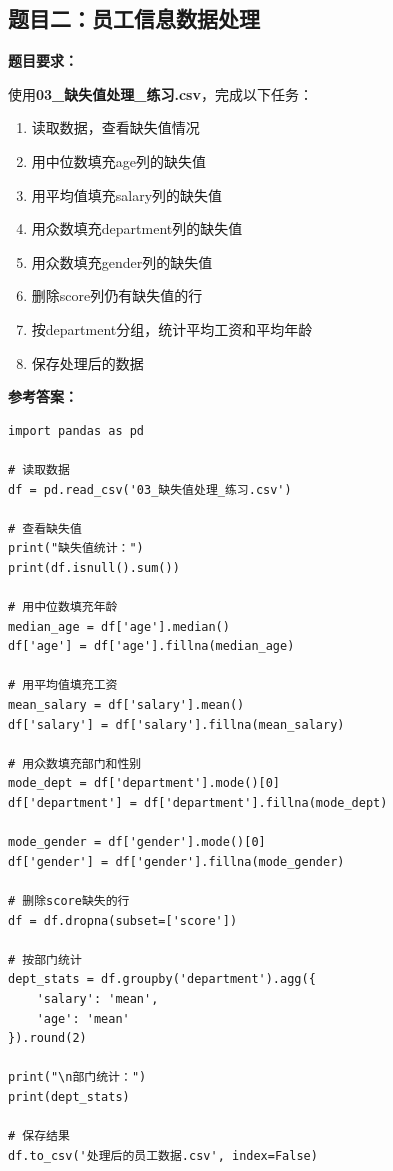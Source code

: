 \documentclass[12pt,a4paper]{article}
\begin{document}
\subsection{题目二：员工信息数据处理}

\begin{practicebox}[竞赛模拟题2]
\textbf{题目要求：}

使用\textbf{03\_缺失值处理\_练习.csv}，完成以下任务：

\begin{enumerate}
    \item 读取数据，查看缺失值情况
    \item 用中位数填充age列的缺失值
    \item 用平均值填充salary列的缺失值
    \item 用众数填充department列的缺失值
    \item 用众数填充gender列的缺失值
    \item 删除score列仍有缺失值的行
    \item 按department分组，统计平均工资和平均年龄
    \item 保存处理后的数据
\end{enumerate}

\textbf{参考答案：}
\begin{lstlisting}
import pandas as pd

# 读取数据
df = pd.read_csv('03_缺失值处理_练习.csv')

# 查看缺失值
print("缺失值统计：")
print(df.isnull().sum())

# 用中位数填充年龄
median_age = df['age'].median()
df['age'] = df['age'].fillna(median_age)

# 用平均值填充工资
mean_salary = df['salary'].mean()
df['salary'] = df['salary'].fillna(mean_salary)

# 用众数填充部门和性别
mode_dept = df['department'].mode()[0]
df['department'] = df['department'].fillna(mode_dept)

mode_gender = df['gender'].mode()[0]
df['gender'] = df['gender'].fillna(mode_gender)

# 删除score缺失的行
df = df.dropna(subset=['score'])

# 按部门统计
dept_stats = df.groupby('department').agg({
    'salary': 'mean',
    'age': 'mean'
}).round(2)

print("\n部门统计：")
print(dept_stats)

# 保存结果
df.to_csv('处理后的员工数据.csv', index=False)
\end{lstlisting}
\end{practicebox}
\end{document}
